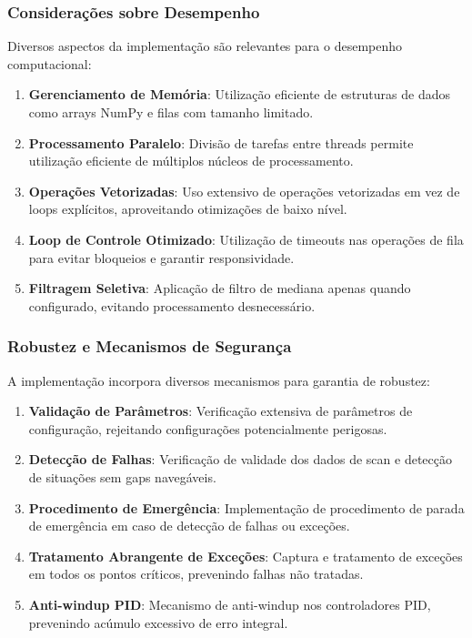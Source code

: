 \subsubsection{Considerações sobre Desempenho}

Diversos aspectos da implementação são relevantes para o desempenho
computacional:

\begin{enumerate}
    \item \textbf{Gerenciamento de Memória}: Utilização eficiente de estruturas de dados como arrays NumPy e filas com tamanho limitado.

    \item \textbf{Processamento Paralelo}: Divisão de tarefas entre threads permite utilização eficiente de múltiplos núcleos de processamento.

    \item \textbf{Operações Vetorizadas}: Uso extensivo de operações vetorizadas em vez de loops explícitos, aproveitando otimizações de baixo nível.

    \item \textbf{Loop de Controle Otimizado}: Utilização de timeouts nas operações de fila para evitar bloqueios e garantir responsividade.

    \item \textbf{Filtragem Seletiva}: Aplicação de filtro de mediana apenas quando configurado, evitando processamento desnecessário.
\end{enumerate}

\subsubsection{Robustez e Mecanismos de Segurança}

A implementação incorpora diversos mecanismos para garantia de robustez:

\begin{enumerate}
    \item \textbf{Validação de Parâmetros}: Verificação extensiva de parâmetros de configuração, rejeitando configurações potencialmente perigosas.

    \item \textbf{Detecção de Falhas}: Verificação de validade dos dados de scan e detecção de situações sem gaps navegáveis.

    \item \textbf{Procedimento de Emergência}: Implementação de procedimento de parada de emergência em caso de detecção de falhas ou exceções.

    \item \textbf{Tratamento Abrangente de Exceções}: Captura e tratamento de exceções em todos os pontos críticos, prevenindo falhas não tratadas.

    \item \textbf{Anti-windup PID}: Mecanismo de anti-windup nos controladores PID, prevenindo acúmulo excessivo de erro integral.
\end{enumerate}

